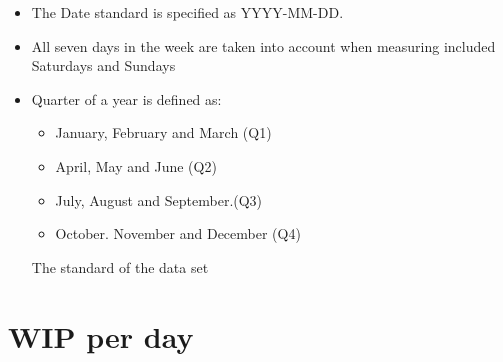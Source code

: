 \documentclass[UKenglish]{ifimaster}  %
\begin{document}
\begin{table}[!ht]
\centering
\begin{itemize}
\item The Date standard is specified as YYYY-MM-DD.
\item All seven days in the week are taken into account when measuring included Saturdays and Sundays
\item Quarter of a year is defined as: 
\begin{itemize}
\item January, February and March (Q1)
\item April, May and June (Q2)
\item July, August and September.(Q3)
\item October. November and December (Q4)
\end{itemize}
\parencite{Quarter}
\caption{The standard of the data set}
\label{tab:measurementDone}
\end{itemize}
\end{table}






\section {WIP per day}
\label{WPD}

\end{document}
